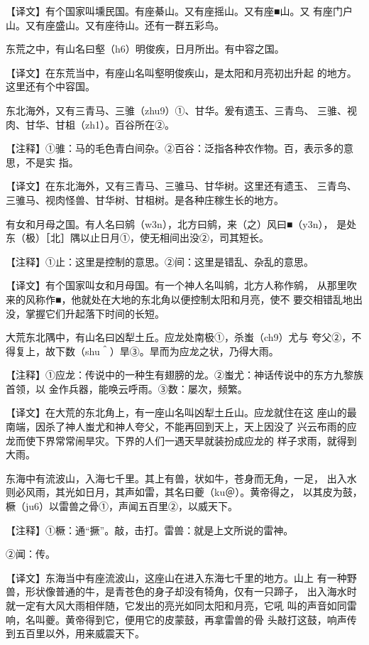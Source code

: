 \documentclass[a4paper,12pt,UTF8,twoside]{ctexbook}
\begin{document}
【译文】有个国家叫壎民国。有座綦山。又有座摇山。又有座■山。又 有座门户山。又有座盛山。又有座待山。还有一群五彩鸟。

东荒之中，有山名曰壑（h6）明俊疾，日月所出。有中容之国。

【译文】在东荒当中，有座山名叫壑明俊疾山，是太阳和月亮初出升起 的地方。这里还有个中容国。

东北海外，又有三青马、三骓（zhu9）①、甘华。爰有遗玉、三青鸟、 三骓、视肉、甘华、甘柤（zh1）。百谷所在②。

【注释】①骓：马的毛色青白间杂。②百谷：泛指各种农作物。百，表示多的意思，不是实 指。

【译文】在东北海外，又有三青马、三骓马、甘华树。这里还有遗玉、 三青鸟、三骓马、视肉怪兽、甘华树、甘柤树。是各种庄稼生长的地方。

有女和月母之国。有人名曰鹓（w3n），北方曰鹓，来（之）风曰■（y3n）， 是处东（极）［北］隅以止日月①，使无相间出没②，司其短长。

【注释】①止：这里是控制的意思。②间：这里是错乱、杂乱的意思。

【译文】有个国家叫女和月母国。有一个神人名叫鹓，北方人称作鹓， 从那里吹来的风称作■，他就处在大地的东北角以便控制太阳和月亮，使不 要交相错乱地出没，掌握它们升起落下时间的长短。

大荒东北隅中，有山名曰凶犁土丘。应龙处南极①，杀蚩（ch9）尤与 夸父②，不得复上，故下数（shu＾）旱③。旱而为应龙之状，乃得大雨。

【注释】①应龙：传说中的一种生有翅膀的龙。②蚩尤：神话传说中的东方九黎族首领，以 金作兵器，能唤云呼雨。③数：屡次，频繁。

【译文】在大荒的东北角上，有一座山名叫凶犁土丘山。应龙就住在这 座山的最南端，因杀了神人蚩尤和神人夸父，不能再回到天上，天上因没了 兴云布雨的应龙而使下界常常闹旱灾。下界的人们一遇天旱就装扮成应龙的 样子求雨，就得到大雨。

东海中有流波山，入海七千里。其上有兽，状如牛，苍身而无角，一足， 出入水则必风雨，其光如日月，其声如雷，其名曰夔（ku＠）。黄帝得之， 以其皮为鼓，橛（ju6）以雷兽之骨①，声闻五百里②，以威天下。

【注释】①橛：通“撅”。敲，击打。雷兽：就是上文所说的雷神。

②闻：传。

【译文】东海当中有座流波山，这座山在进入东海七千里的地方。山上 有一种野兽，形状像普通的牛，是青苍色的身子却没有犄角，仅有一只蹄子， 出入海水时就一定有大风大雨相伴随，它发出的亮光如同太阳和月亮，它吼 叫的声音如同雷响，名叫夔。黄帝得到它，便用它的皮蒙鼓，再拿雷兽的骨 头敲打这鼓，响声传到五百里以外，用来威震天下。
\end{document}
